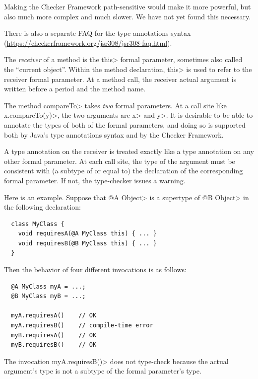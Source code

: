 Making the Checker Framework path-sensitive would make it more powerful,
but also much more complex and much slower.  We have not yet found this
necessary.



There is also a separate FAQ for the type annotations syntax
(\url{https://checkerframework.org/jsr308/jsr308-faq.html}).



The \emph{receiver} of a method is the \<this> formal parameter, sometimes
also called the ``current object''.  Within the method declaration, \<this>
is used to refer to the receiver formal parameter.  At a method call, the
receiver actual argument is written before a period and the method name.

The method \<compareTo> takes \emph{two} formal parameters.  At a call site
like \<x.compareTo(y)>, the two arguments are \<x> and \<y>.  It is
desirable to be able to annotate the types of both of the formal
parameters, and doing so is supported both by Java's type annotations
syntax and by the Checker Framework.

A type annotation on the receiver is treated exactly like a type annotation
on any other formal parameter.  At each call site, the type of the argument
must be consistent with (a subtype of or equal to) the declaration of the
corresponding formal parameter.  If not, the type-checker issues a warning.

Here is an example.  Suppose that \<@A Object> is a supertype of \<@B
Object> in the following declaration:

\begin{Verbatim}
  class MyClass {
    void requiresA(@A MyClass this) { ... }
    void requiresB(@B MyClass this) { ... }
  }
\end{Verbatim}

\noindent
Then the behavior of four different invocations is as follows:

\begin{Verbatim}
  @A MyClass myA = ...;
  @B MyClass myB = ...;

  myA.requiresA()    // OK
  myA.requiresB()    // compile-time error
  myB.requiresA()    // OK
  myB.requiresB()    // OK
\end{Verbatim}

The invocation \<myA.requiresB()> does not type-check because the actual
argument's type is not a subtype of the formal parameter's type.

